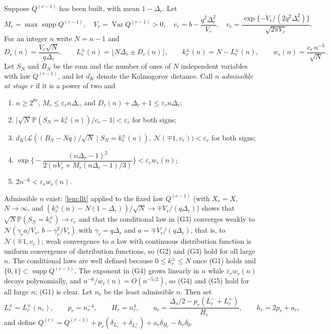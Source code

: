 \documentclass[11pt]{amsart}
\theoremstyle{definition}
\newcommand{\Prob}{\mathbb{P}}
\newcommand{\Law}{\mathcal{L}}
\newcommand{\Nor}{\mathcal{N}}
\DeclareMathOperator{\Var}{Var}
\DeclareMathOperator{\supp}{supp}
\begin{document}
Suppose $Q^{(r-1)}$ has been built, with mean $1-\Delta_r$. Let
\[
M_r=\max\supp Q^{(r-1)},\quad V_r=\Var Q^{(r-1)}>0,\quad v_r=b-\frac{q^2\Delta_r^2}{V_r},\quad
c_r=\frac{\exp\{-V_r/(2q^2\Delta_r^2)\}}{\sqrt{2\pi V_r}}.
\]
For an integer $n$ write $N=n-1$ and
\begin{equation}\label{eq:critatoms}
D_r(n)=\frac{V_r\sqrt N}{q\Delta_r},\qquad L_r^\pm(n)=\big\lfloor N\Delta_r\pm D_r(n)\big\rfloor,\qquad k_r^\pm(n)=N-L_r^\pm(n),\qquad w_r(n)=\frac{c_r\,n^{-3}}{\sqrt N}.
\end{equation}
Let $S_N$ and $B_N$ be the sum and the number of ones of $N$ independent variables with law $Q^{(r-1)}$, and let $d_K$ denote the Kolmogorov distance. Call $n$ \emph{admissible at stage $r$} if it is a power of two and
\begin{enumerate}
\item[(G1)] $n\ge2^{8r}$, $M_r\le\varepsilon_rn\Delta_r$, and $D_r(n)+\Delta_r+1\le\varepsilon_rn\Delta_r$;
\item[(G2)] $\big|\sqrt N\,\Prob(S_N=k_r^\pm(n))/c_r-1\big|<\varepsilon_r$ for both signs;
\item[(G3)] $d_K\big(\Law((B_N-Nq)/\sqrt N\mid S_N=k_r^\pm(n)),\ \Nor(\mp1,v_r)\big)<\varepsilon_r$ for both signs;
\item[(G4)] $\exp\Big\{-\dfrac{(n\Delta_r-1)^2}{2(nV_r+M_r(n\Delta_r-1)/3)}\Big\}<\varepsilon_rw_r(n)$;
\item[(G5)] $2n^{-6}<\varepsilon_rw_r(n)$.
\end{enumerate}
Admissible $n$ exist: \cref{lem:llt} applied to the fixed law $Q^{(r-1)}$ (with $X_r=X$, $N\to\infty$, and $(k_r^\pm(n)-N(1-\Delta_r))/\sqrt N\to\mp V_r/(q\Delta_r)$) shows that $\sqrt N\Prob(S_N=k_r^\pm)\to c_r$ and that the conditional law in (G3) converges weakly to $\Nor(\gamma_ra/V_r,\,b-\gamma_r^2/V_r)$ with $\gamma_r=q\Delta_r$ and $a=\mp V_r/(q\Delta_r)$, that is, to $\Nor(\mp1,v_r)$; weak convergence to a law with continuous distribution function is uniform convergence of distribution functions, so (G2) and (G3) hold for all large $n$. The conditional laws are well defined because $0\le k_r^\pm\le N$ once (G1) holds and $\{0,1\}\subset\supp Q^{(r-1)}$. The exponent in (G4) grows linearly in $n$ while $\varepsilon_rw_r(n)$ decays polynomially, and $n^{-6}/w_r(n)=O(n^{-5/2})$, so (G4) and (G5) hold for all large $n$; (G1) is clear. Let $n_r$ be the least admissible $n$. Then set
\[
L_r^\pm=L_r^\pm(n_r),\qquad p_r=n_r^{-4},\qquad H_r=n_r^4,\qquad a_r=\frac{\Delta_r/2-p_r(L_r^-+L_r^+)}{H_r},\qquad h_r=2p_r+a_r,
\]
and define $Q^{(r)}=Q^{(r-1)}+p_r(\delta_{L_r^-}+\delta_{L_r^+})+a_r\delta_{H_r}-h_r\delta_0$.
\end{document}
